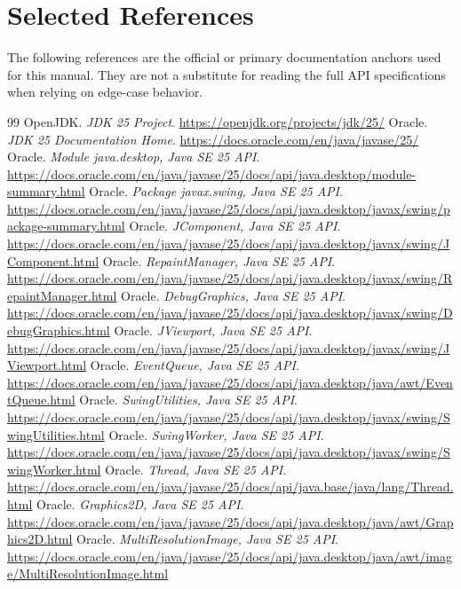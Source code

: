 \chapter{Selected References}

The following references are the official or primary documentation anchors used for this manual. They are not a substitute for reading the full API specifications when relying on edge-case behavior.

\begin{thebibliography}{99}
 OpenJDK. \emph{JDK 25 Project}. \url{https://openjdk.org/projects/jdk/25/}
 Oracle. \emph{JDK 25 Documentation Home}. \url{https://docs.oracle.com/en/java/javase/25/}
 Oracle. \emph{Module java.desktop, Java SE 25 API}. \url{https://docs.oracle.com/en/java/javase/25/docs/api/java.desktop/module-summary.html}
 Oracle. \emph{Package javax.swing, Java SE 25 API}. \url{https://docs.oracle.com/en/java/javase/25/docs/api/java.desktop/javax/swing/package-summary.html}
 Oracle. \emph{JComponent, Java SE 25 API}. \url{https://docs.oracle.com/en/java/javase/25/docs/api/java.desktop/javax/swing/JComponent.html}
 Oracle. \emph{RepaintManager, Java SE 25 API}. \url{https://docs.oracle.com/en/java/javase/25/docs/api/java.desktop/javax/swing/RepaintManager.html}
 Oracle. \emph{DebugGraphics, Java SE 25 API}. \url{https://docs.oracle.com/en/java/javase/25/docs/api/java.desktop/javax/swing/DebugGraphics.html}
 Oracle. \emph{JViewport, Java SE 25 API}. \url{https://docs.oracle.com/en/java/javase/25/docs/api/java.desktop/javax/swing/JViewport.html}
 Oracle. \emph{EventQueue, Java SE 25 API}. \url{https://docs.oracle.com/en/java/javase/25/docs/api/java.desktop/java/awt/EventQueue.html}
 Oracle. \emph{SwingUtilities, Java SE 25 API}. \url{https://docs.oracle.com/en/java/javase/25/docs/api/java.desktop/javax/swing/SwingUtilities.html}
 Oracle. \emph{SwingWorker, Java SE 25 API}. \url{https://docs.oracle.com/en/java/javase/25/docs/api/java.desktop/javax/swing/SwingWorker.html}
 Oracle. \emph{Thread, Java SE 25 API}. \url{https://docs.oracle.com/en/java/javase/25/docs/api/java.base/java/lang/Thread.html}
 Oracle. \emph{Graphics2D, Java SE 25 API}. \url{https://docs.oracle.com/en/java/javase/25/docs/api/java.desktop/java/awt/Graphics2D.html}
 Oracle. \emph{MultiResolutionImage, Java SE 25 API}. \url{https://docs.oracle.com/en/java/javase/25/docs/api/java.desktop/java/awt/image/MultiResolutionImage.html}

\end{thebibliography}
